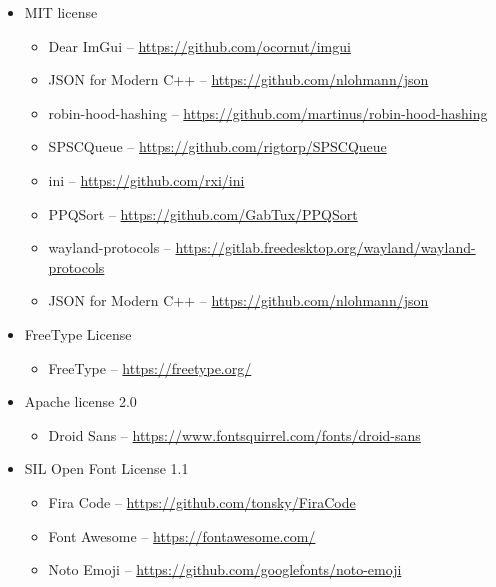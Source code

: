 \documentclass[hidelinks,titlepage,a4paper,twoside]{article}
\begin{document}
\begin{itemize}
\item MIT license
\begin{itemize}
\item Dear ImGui -- \url{https://github.com/ocornut/imgui}
\item JSON for Modern C++ -- \url{https://github.com/nlohmann/json}
\item robin-hood-hashing -- \url{https://github.com/martinus/robin-hood-hashing}
\item SPSCQueue \faStar{} -- \url{https://github.com/rigtorp/SPSCQueue}
\item ini -- \url{https://github.com/rxi/ini}
\item PPQSort -- \url{https://github.com/GabTux/PPQSort}
\item wayland-protocols -- \url{https://gitlab.freedesktop.org/wayland/wayland-protocols}
\item JSON for Modern C++ -- \url{https://github.com/nlohmann/json}
\end{itemize}

\item FreeType License
\begin{itemize}
\item FreeType -- \url{https://freetype.org/}
\end{itemize}

\item Apache license 2.0
\begin{itemize}
\item Droid Sans -- \url{https://www.fontsquirrel.com/fonts/droid-sans}
\end{itemize}

\item SIL Open Font License 1.1
\begin{itemize}
\item Fira Code -- \url{https://github.com/tonsky/FiraCode}
\item Font Awesome -- \url{https://fontawesome.com/}
\item Noto Emoji -- \url{https://github.com/googlefonts/noto-emoji}
\end{itemize}

\end{itemize}



\end{document}
